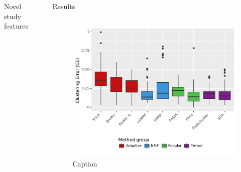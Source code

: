 \documentclass[xcolor=table,final]{beamer}
\newlength{\sepwid}
\newlength{\onecolwid}
\newlength{\twocolwid}
\begin{document}
\begin{frame}[t]
\begin{columns}[t]
\begin{column}{\onecolwid}
\begin{block}{Novel study features}
\end{block}





\end{column} %

\begin{column}{\sepwid}\end{column} %

\begin{column}{\twocolwid} %


\begin{block}{Results}
\end{block}

\begin{columns}
\begin{column}{\onecolwid}

\begin{figure}
\includegraphics[width=0.9 \textwidth]{plots/summary_clust_err_best_theoretical_K_init.pdf}
\caption{Caption}
\end{figure}


\end{column}
\end{columns}
\end{column}
\end{columns}
\end{frame}
\end{document}
